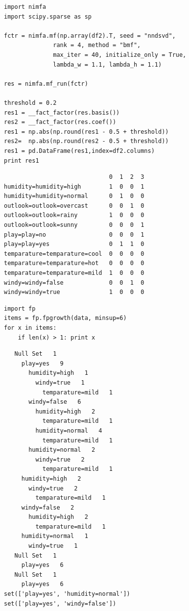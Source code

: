\documentclass[12pt,fleqn]{article}\usepackage{../common}
\begin{document}
\begin{verbatim}
import nimfa
import scipy.sparse as sp

fctr = nimfa.mf(np.array(df2).T, seed = "nndsvd", 
              rank = 4, method = "bmf", 
              max_iter = 40, initialize_only = True,
              lambda_w = 1.1, lambda_h = 1.1)

res = nimfa.mf_run(fctr)

threshold = 0.2
res1 = __fact_factor(res.basis())
res2 = __fact_factor(res.coef())
res1 = np.abs(np.round(res1 - 0.5 + threshold))
res2=  np.abs(np.round(res2 - 0.5 + threshold))
res1 = pd.DataFrame(res1,index=df2.columns)
print res1
\end{verbatim}

\begin{verbatim}
                              0  1  2  3
humidity=humidity=high        1  0  0  1
humidity=humidity=normal      0  1  0  0
outlook=outlook=overcast      0  0  1  0
outlook=outlook=rainy         1  0  0  0
outlook=outlook=sunny         0  0  0  1
play=play=no                  0  0  0  1
play=play=yes                 0  1  1  0
temparature=temparature=cool  0  0  0  0
temparature=temparature=hot   0  0  0  0
temparature=temparature=mild  1  0  0  0
windy=windy=false             0  0  1  0
windy=windy=true              1  0  0  0
\end{verbatim}

\begin{verbatim}
import fp
items = fp.fpgrowth(data, minsup=6)
for x in items:
    if len(x) > 1: print x
\end{verbatim}

\begin{verbatim}
   Null Set   1
     play=yes   9
       humidity=high   1
         windy=true   1
           temparature=mild   1
       windy=false   6
         humidity=high   2
           temparature=mild   1
         humidity=normal   4
           temparature=mild   1
       humidity=normal   2
         windy=true   2
           temparature=mild   1
     humidity=high   2
       windy=true   2
         temparature=mild   1
     windy=false   2
       humidity=high   2
         temparature=mild   1
     humidity=normal   1
       windy=true   1
   Null Set   1
     play=yes   6
   Null Set   1
     play=yes   6
set(['play=yes', 'humidity=normal'])
set(['play=yes', 'windy=false'])
\end{verbatim}
\end{document}
